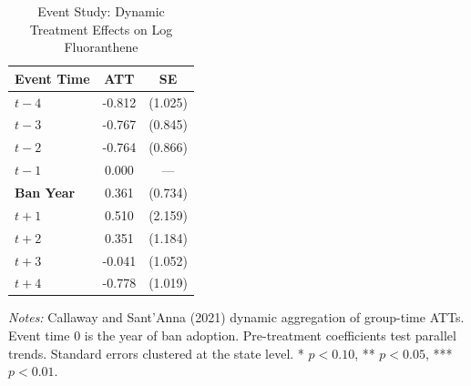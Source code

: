 \begin{table}[htbp]
\centering
\caption{Event Study: Dynamic Treatment Effects on Log Fluoranthene}
\label{tab:event}
\begin{tabular}{lcc}
\toprule
Event Time & ATT & SE \\
\midrule
$t - 4$ & -0.812 & (1.025) \\
$t - 3$ & -0.767 & (0.845) \\
$t - 2$ & -0.764 & (0.866) \\
$t - 1$ & 0.000 & --- \\
\midrule
\textbf{Ban Year} & 0.361 & (0.734) \\
$t + 1$ & 0.510 & (2.159) \\
$t + 2$ & 0.351 & (1.184) \\
$t + 3$ & -0.041 & (1.052) \\
$t + 4$ & -0.778 & (1.019) \\
\bottomrule
\end{tabular}
\begin{tablenotes}
\item \textit{Notes:} Callaway and Sant'Anna (2021) dynamic aggregation of group-time ATTs. 
Event time 0 is the year of ban adoption. Pre-treatment coefficients test parallel trends. 
Standard errors clustered at the state level. 
* $p<0.10$, ** $p<0.05$, *** $p<0.01$.
\end{tablenotes}
\end{table}
